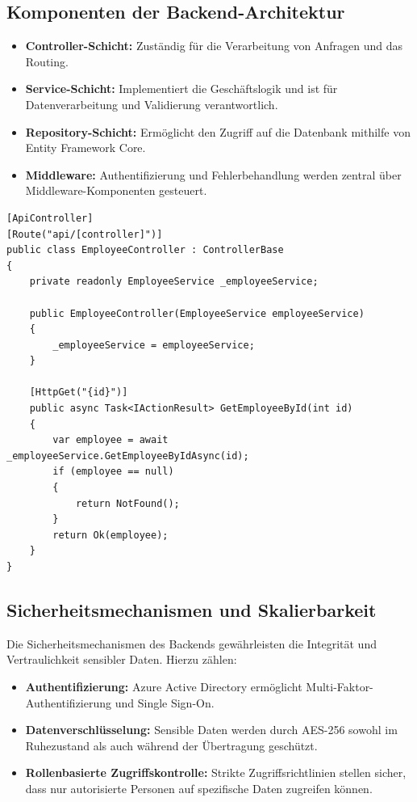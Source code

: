 \subsection{Komponenten der Backend-Architektur}
\begin{itemize}
    \item \textbf{Controller-Schicht:} Zuständig für die Verarbeitung von Anfragen und das Routing.
    \item \textbf{Service-Schicht:} Implementiert die Geschäftslogik und ist für Datenverarbeitung und Validierung verantwortlich.
    \item \textbf{Repository-Schicht:} Ermöglicht den Zugriff auf die Datenbank mithilfe von Entity Framework Core.
    \item \textbf{Middleware:} Authentifizierung und Fehlerbehandlung werden zentral über Middleware-Komponenten gesteuert.
\end{itemize}

\begin{verbatim}
[ApiController]
[Route("api/[controller]")]
public class EmployeeController : ControllerBase
{
    private readonly EmployeeService _employeeService;

    public EmployeeController(EmployeeService employeeService)
    {
        _employeeService = employeeService;
    }

    [HttpGet("{id}")]
    public async Task<IActionResult> GetEmployeeById(int id)
    {
        var employee = await _employeeService.GetEmployeeByIdAsync(id);
        if (employee == null)
        {
            return NotFound();
        }
        return Ok(employee);
    }
}
\end{verbatim}


\subsection{Sicherheitsmechanismen und Skalierbarkeit}
Die Sicherheitsmechanismen des Backends gewährleisten die Integrität und Vertraulichkeit sensibler Daten. Hierzu zählen:
\begin{itemize}
    \item \textbf{Authentifizierung:} Azure Active Directory ermöglicht Multi-Faktor-Authentifizierung und Single Sign-On.
    \item \textbf{Datenverschlüsselung:} Sensible Daten werden durch AES-256 sowohl im Ruhezustand als auch während der Übertragung geschützt.
    \item \textbf{Rollenbasierte Zugriffskontrolle:} Strikte Zugriffsrichtlinien stellen sicher, dass nur autorisierte Personen auf spezifische Daten zugreifen können.
\end{itemize}

